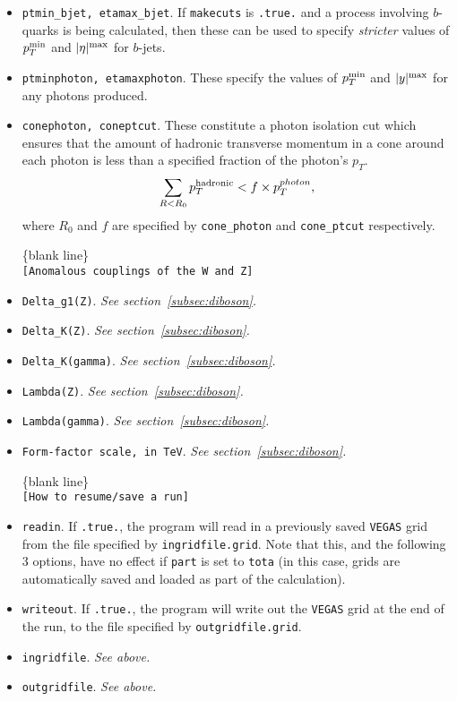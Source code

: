 \documentclass[12pt]{article}
\begin{document}
\begin{itemize}
\item {\tt ptmin\_bjet,  etamax\_bjet}. If {\tt makecuts} is {\tt .true.}
and a process involving $b$-quarks is being calculated, then these can
be used to specify {\em stricter} values of $p_T^{\rm min}$
and $|\eta|^{\rm max}$ for $b$-jets.

\item {\tt ptminphoton, etamaxphoton}. These specify the values
of $p_T^{\rm min}$ and $|y|^{\rm max}$ for any photons produced.

\item {\tt conephoton, coneptcut}. These constitute a photon isolation
cut which ensures that the amount of hadronic
transverse momentum in a cone around each photon is less than
a specified fraction of the photon's $p_T$.
\begin{displaymath}
\sum_{R < R_0} p_T^{\rm hadronic} < f \times p_T^{photon},
\end{displaymath}
where $R_0$ and $f$ are specified by {\tt cone\_photon} and
{\tt cone\_ptcut} respectively.

\begin{center}
\{blank line\} \\
{\tt [Anomalous couplings of the W and Z] }
\end{center}

\item {\tt Delta\_g1(Z)}. {\it See section~\ref{subsec:diboson}.}
\item {\tt Delta\_K(Z)}. {\it See section~\ref{subsec:diboson}.}
\item {\tt Delta\_K(gamma)}. {\it See section~\ref{subsec:diboson}.}
\item {\tt Lambda(Z)}. {\it See section~\ref{subsec:diboson}.}
\item {\tt Lambda(gamma)}. {\it See section~\ref{subsec:diboson}.}
\item {\tt Form-factor scale, in TeV}. {\it See section~\ref{subsec:diboson}.}

\begin{center}
\{blank line\} \\
{\tt [How to resume/save a run] }
\end{center}

\item {\tt readin}. If {\tt .true.}, the program will read in a
previously saved {\tt VEGAS} grid from the file specified by
{\tt ingridfile.grid}. Note that this, and the following 3 options,
have no effect if {\tt part} is set to {\tt tota} (in this case, grids
are automatically saved and loaded as part of the calculation).

\item {\tt writeout}. If {\tt .true.}, the program will write out
the {\tt VEGAS} grid at the end of the run, to the file specified by
{\tt outgridfile.grid}.

\item {\tt ingridfile}.  {\it See above.}

\item {\tt outgridfile}.  {\it See above.}

\end{itemize}
\end{document}
